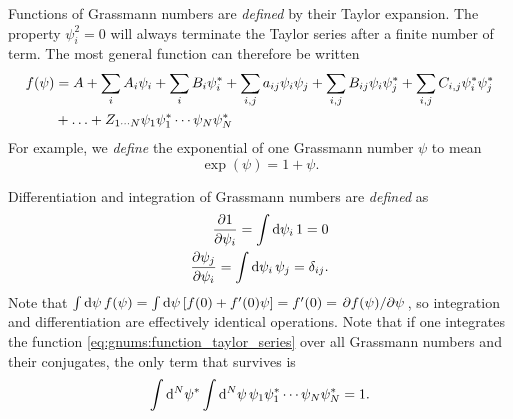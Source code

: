 Functions of Grassmann numbers are \emph{defined} by their Taylor expansion.
The property $\psi_i^2 = 0$ will always terminate the Taylor series after a finite number of term.
The most general function can therefore be written
\begin{equation}
\begin{split}
	f(\psi) &= A + \sum_i A_i \psi_i + \sum_i B_i {\psi}^*_i + \sum_{i,j} a_{ij} \psi_i \psi_j + \sum_{i,j} B_{ij} \psi_i {\psi}^*_j + \sum_{i,j} C_{i,j} {\psi}^*_i {\psi}^*_j \\
	        &+ \ldots + Z_{1 \cdots N} \psi_1 {\psi}^*_1 \cdots \psi_N {\psi}^*_N
\end{split}
\label{eq:gnums:function_taylor_series}
\end{equation}
For example, we \emph{define} the exponential of one Grassmann number $\psi$ to mean
\begin{equation}
	\exp(\psi) = 1 + \psi .
\label{eq:gnums:exponential_taylor_series}
\end{equation}

Differentiation and integration of Grassmann numbers are \emph{defined} as
\begin{equation}
\begin{split}
	\pdv{1}{\psi_i} = \int \mathop{}\!\mathrm{d} \psi_i \, 1 = 0 \\
	\pdv{\psi_j}{\psi_i} = \int \mathop{}\!\mathrm{d} \psi_i \, \psi_j = \delta_{ij} . \\
\end{split}
\label{eq:gnums:integration_differentiation}
\end{equation}
Note that $\int \mathop{}\!\mathrm{d} \psi \, f(\psi) = \int \mathop{}\!\mathrm{d} \psi \, [f(0) + f'(0) \psi] = f'(0) = \pdv{f(\psi)}/{\psi}$, so integration and differentiation are effectively identical operations.
Note that if one integrates the function \eqref{eq:gnums:function_taylor_series} over all Grassmann numbers and their conjugates, the only term that survives is
\begin{equation}
	\int \mathop{}\!\mathrm{d}^N {\psi}^* \int \mathop{}\!\mathrm{d}^N \psi \, \psi_1 {\psi}^*_1 \cdots \psi_N {\psi}^*_N = 1 .
\label{eq:gnums:integration_over_all}
\end{equation}


